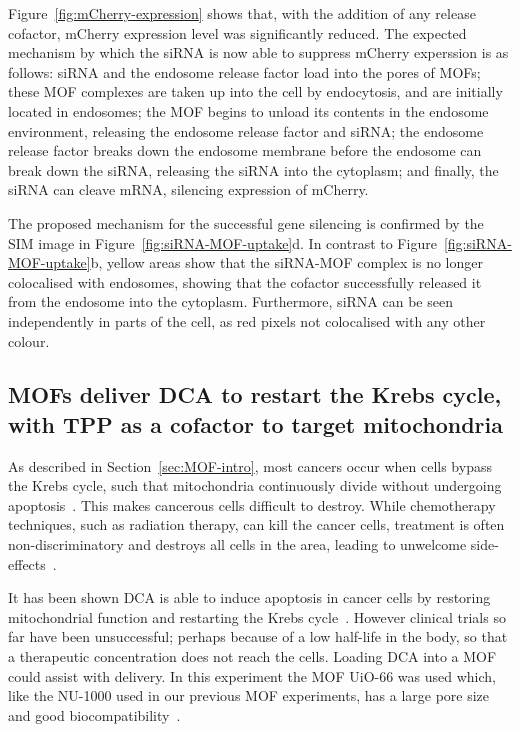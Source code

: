 Figure~\ref{fig:mCherry-expression} shows that, with the addition of any release cofactor, mCherry expression level was significantly reduced. 
The expected mechanism by which the siRNA is now able to suppress mCherry experssion is as follows: siRNA and the endosome release factor load into the pores of MOFs; these MOF complexes are taken up into the cell by endocytosis, and are initially located in endosomes; the MOF begins to unload its contents in the endosome environment, releasing the endosome release factor and siRNA; the endosome release factor breaks down the endosome membrane before the endosome can break down the siRNA, releasing the siRNA into the cytoplasm; and finally, the siRNA can cleave mRNA, silencing expression of mCherry.

The proposed mechanism for the successful gene silencing is confirmed by the SIM image in Figure~\ref{fig:siRNA-MOF-uptake}d. 
In contrast to Figure~\ref{fig:siRNA-MOF-uptake}b, yellow areas show that the siRNA-MOF complex is no longer colocalised with endosomes, showing that the cofactor successfully released it from the endosome into the cytoplasm. 
Furthermore, siRNA can be seen independently in parts of the cell, as red pixels not colocalised with any other colour. 

\subsection{MOFs deliver DCA to restart the Krebs cycle, with TPP as a cofactor to target mitochondria}
As described in Section~\ref{sec:MOF-intro}, most cancers occur when cells bypass the Krebs cycle, such that mitochondria continuously divide without undergoing apoptosis~\cite{murray1993cell}.
This makes cancerous cells difficult to destroy. 
While chemotherapy techniques, such as radiation therapy, can kill the cancer cells, treatment is often non-discriminatory and destroys all cells in the area, leading to unwelcome side-effects~\cite{coates1983receiving, de1997patient, minami2010cardiovascular}. 

It has been shown DCA is able to induce apoptosis in cancer cells by restoring mitochondrial function and restarting the Krebs cycle~\cite{bonnet2007mitochondria}. 
However clinical trials so far have been unsuccessful; perhaps because of a low half-life in the body, so that a therapeutic concentration does not reach the cells. 
Loading DCA into a MOF could assist with delivery. 
In this experiment the MOF UiO-66 was used which, like the NU-1000 used in our previous MOF experiments, has a large pore size and good biocompatibility~\cite{abanades2018mechanistic}. 

